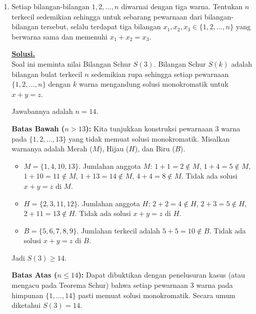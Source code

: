 \documentclass[12pt,twoside]{article}
\newenvironment{solution}
{
	\par\noindent\textbf{\underline{Solusi.}}\\
}
{
	\par
}
\begin{document}
\begin{enumerate}
  \item Setiap bilangan-bilangan $1,2,\dots,n$ diwarnai dengan tiga warna. Tentukan $n$ terkecil sedemikian sehingga untuk sebarang pewarnaan dari bilangan-bilangan tersebut, selalu terdapat tiga bilangan $x_1,x_2,x_3\in\{1,2,\dots,n\}$ yang berwarna sama dan memenuhi $x_1+x_2=x_3$.
        \begin{solution}
          Soal ini meminta nilai Bilangan Schur $S(3)$.
          Bilangan Schur $S(k)$ adalah bilangan bulat terkecil $n$ sedemikian rupa sehingga setiap pewarnaan $\{1, 2, \dots, n\}$ dengan $k$ warna mengandung solusi monokromatik untuk $x+y=z$.

          Jawabannya adalah $n=14$.

          \textbf{Batas Bawah ($n > 13$):}
          Kita tunjukkan konstruksi pewarnaan 3 warna pada $\{1, 2, \dots, 13\}$ yang tidak memuat solusi monokromatik.
          Misalkan warnanya adalah Merah ($M$), Hijau ($H$), dan Biru ($B$).
          \begin{itemize}
            \item $M = \{1, 4, 10, 13\}$.
                  Jumlahan anggota $M$: $1+1=2 \notin M$, $1+4=5 \notin M$, $1+10=11 \notin M$, $1+13=14 \notin M$, $4+4=8 \notin M$. Tidak ada solusi $x+y=z$ di $M$.
            \item $H = \{2, 3, 11, 12\}$.
                  Jumlahan anggota $H$: $2+2=4 \notin H$, $2+3=5 \notin H$, $2+11=13 \notin H$. Tidak ada solusi $x+y=z$ di $H$.
            \item $B = \{5, 6, 7, 8, 9\}$.
                  Jumlahan terkecil adalah $5+5=10 \notin B$. Tidak ada solusi $x+y=z$ di $B$.
          \end{itemize}
          Jadi $S(3) \ge 14$.

          \textbf{Batas Atas ($n \le 14$):}
          Dapat dibuktikan dengan penelusuran kasus (atau mengacu pada Teorema Schur) bahwa setiap pewarnaan 3 warna pada himpunan $\{1, \dots, 14\}$ pasti memuat solusi monokromatik.
          Secara umum diketahui $S(3) = 14$.
        \end{solution}

\end{enumerate}
\newpage
\end{document}
